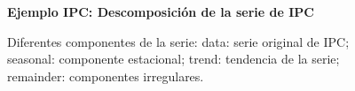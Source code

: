 \begin{figure}[H]
	\centering
	\textbf{Ejemplo IPC: Descomposición de la serie de IPC}\par\medskip
	\caption{Diferentes componentes de la serie: data: serie original de IPC; seasonal: componente estacional; trend: tendencia de la serie; remainder: componentes irregulares.}\label{fig20}
\end{figure}



